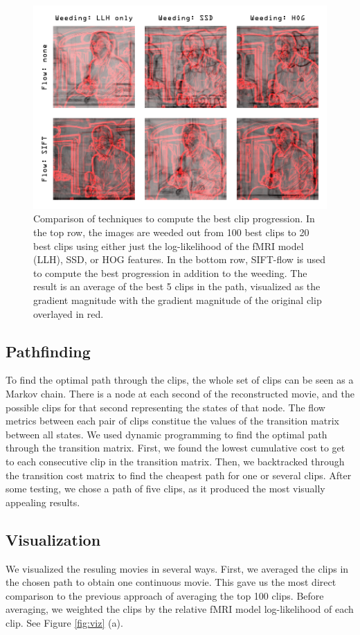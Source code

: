 \begin{figure}
\centering
    \includegraphics[width=1.0\columnwidth]{figures/methodcomp.png}
\caption{Comparison of techniques to compute the best clip progression. In the top row, the images are weeded out from 100 best clips to 20 best clips using either just the log-likelihood of the fMRI model (LLH), SSD, or HOG features. In the bottom row, SIFT-flow is used to compute the best progression in addition to the weeding. The result is an average of the best 5 clips in the path, visualized as the gradient magnitude with the gradient magnitude of the original clip overlayed in red.}
\label{fig:comparison}
\end{figure}

\subsection{Pathfinding}
To find the optimal path through the clips, the whole set of clips can be seen as a Markov chain. There is a node at each second of the reconstructed movie, and the possible clips for that second representing the states of that node. The flow metrics between each pair of clips constitue the values of the transition matrix between all states. We used dynamic programming to find the optimal path through the transition matrix. First, we found the lowest cumulative cost to get to each consecutive clip in the transition matrix. Then, we backtracked through the transition cost matrix to find the cheapest path for one or several clips. After some testing, we chose a path of five clips, as it produced the most visually appealing results.

\subsection{Visualization}
We visualized the resuling movies in several ways. First, we averaged the clips in the chosen path to obtain one continuous movie. This gave us the most direct comparison to the previous approach of averaging the top 100 clips. Before averaging, we weighted the clips by the relative fMRI model log-likelihood of each clip. See Figure \ref{fig:viz} (a).

